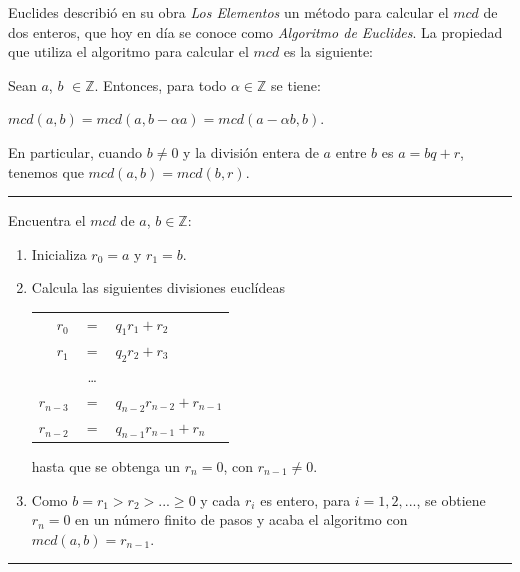 \hfil

Euclides describió en su obra \textit{Los Elementos} un método para calcular el $mcd$ de dos enteros, que hoy en día se conoce como \textit{Algoritmo de Euclides}. La propiedad que utiliza el algoritmo para calcular el $mcd$ es la siguiente:



\begin{proposition}
	Sean $a$, $b$ $\in \mathbb{Z}$. Entonces, para todo $\alpha \in \mathbb{Z}$ se tiene:
	\begin{center}
		$mcd(a,b) = mcd(a, b-\alpha a) = mcd(a-\alpha b, b).$
	\end{center}
	En particular, cuando $b \neq 0$ y la división entera de $a$ entre $b$ es $a = bq + r$, tenemos que $mcd(a,b) = mcd(b, r)$.
\end{proposition}

\hfil


\rule{\textwidth}{1pt}
\begin{algorithm}[Euclides]
	Encuentra el $mcd$ de $a$, $b \in \mathbb{Z}$:
	
	\begin{enumerate}
		\item Inicializa $r_0 = a$ y $r_1 = b$.
		
		\item Calcula las siguientes divisiones euclídeas
		
		\begin{tabular}{rcl}
			$r_0$ & $=$ & $q_1 r_1 + r_2$ \\
			$r_1$ & $=$ & $q_2 r_2 + r_3$ \\
			& \dots & \\
			$r_{n-3}$ & $=$ & $q_{n-2} r_{n-2} + r_{n-1}$ \\
			$r_{n-2}$ & $=$ & $q_{n-1} r_{n-1} + r_{n}$ \\
		\end{tabular}
		
		hasta que se obtenga un $r_n = 0$, con $r_{n-1} \neq 0$.
		
		\item Como $b = r_1 > r_2 > ... \geq 0$ y cada $r_i$ es entero, para $i = 1, 2, ...$, se obtiene $r_n = 0$ en un número finito de pasos y acaba el algoritmo con $mcd(a,b) = r_{n-1}$.
		
	\end{enumerate}
\end{algorithm}
\rule{\textwidth}{1pt}

\hfil

